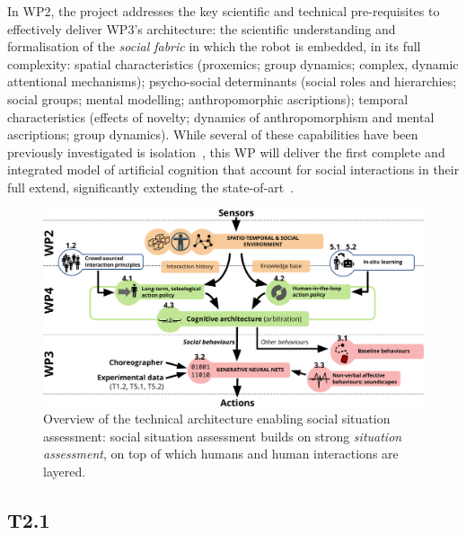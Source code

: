 \documentclass[11pt,a4paper]{report}
\begin{document}
\noindent{}

In WP2, the project addresses the key scientific and technical pre-requisites to
effectively deliver WP3's architecture:  the scientific understanding and
formalisation of the \emph{social fabric} in which the robot is embedded, in its
full complexity: spatial characteristics (proxemics; group dynamics; complex,
dynamic attentional mechanisms); psycho-social determinants (social roles and
hierarchies; social groups; mental modelling; anthropomorphic ascriptions);
temporal characteristics (effects of novelty; dynamics of anthropomorphism and
mental ascriptions; group dynamics).  While several of these capabilities have
been previously investigated is isolation~\cite{lemaignan2014dynamics,
flook2019impact,lemaignan2015youre, fink2014which, ros2010which,
warnier2012when, lemaignan2015mutual, dillenbourg2016symmetry,
winkle2019effective}, this WP will deliver the first complete and integrated
model of artificial cognition that account for social interactions in their full
extend, significantly extending the state-of-art~\cite{lemaignan2017artificial,
baxter2016cognitive}.

\begin{figure}
\centering
\includegraphics[width=0.9\linewidth]{figs/archi}
\caption{Overview of the technical architecture enabling social situation
    assessment: social situation assessment builds on strong \emph{situation
    assessment}, on top of which humans and human interactions are layered.}
\label{fig:social-situation-assessment}
\end{figure}



\subsection{T2.1}
\end{document}

